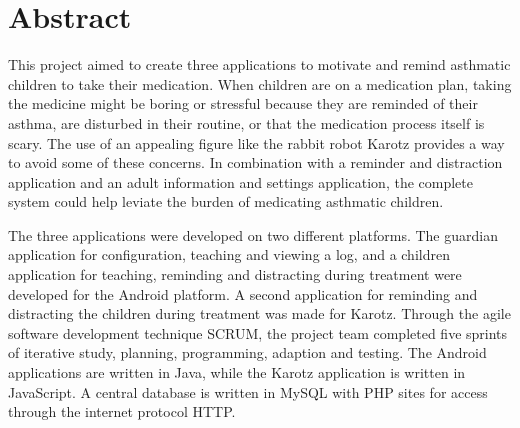 \section*{Abstract}
\setcounter{page}{1}



This project aimed to create three applications to motivate and remind asthmatic children to 
take their medication. When children are on a medication plan, taking the medicine might be boring or stressful 
because they are reminded of their asthma, are disturbed in their routine, or that the medication
process itself is scary. The use of an appealing figure like the rabbit robot Karotz provides a way to avoid
some of these concerns. In combination with a reminder and distraction application and an adult information
and settings application, the complete system could help leviate the burden of medicating asthmatic children.

The three applications were developed on two different platforms. The guardian application for configuration, 
teaching and viewing a log, and a children application for teaching, reminding and distracting during treatment were developed 
for the Android platform. A second application for reminding and distracting the children during treatment was made for 
Karotz. Through the agile software development technique SCRUM, the project team completed five sprints of 
iterative study, planning, programming, adaption and testing. The Android applications are written in Java, 
while the Karotz application is written in JavaScript. A central database is written in MySQL 
with PHP sites for access through the internet protocol HTTP.

